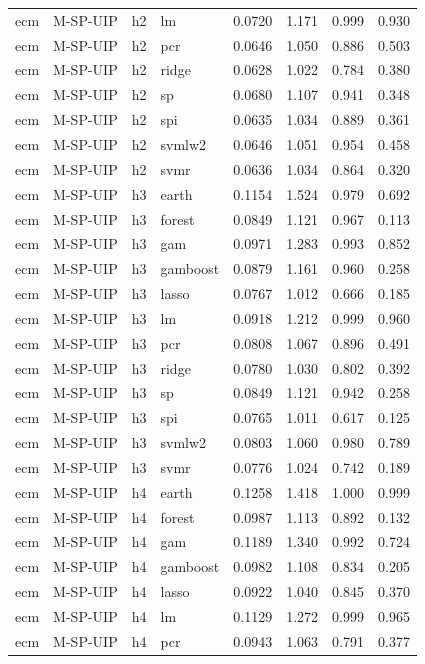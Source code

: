 \begin{ThreePartTable}
\begin{longtable}[t]{llclcccc}
ecm & M-SP-UIP & h2 & lm & 0.0720 & 1.171 & 0.999 & 0.930\\
ecm & M-SP-UIP & h2 & pcr & 0.0646 & 1.050 & 0.886 & 0.503\\
ecm & M-SP-UIP & h2 & ridge & 0.0628 & 1.022 & 0.784 & 0.380\\
ecm & M-SP-UIP & h2 & sp & 0.0680 & 1.107 & 0.941 & 0.348\\
ecm & M-SP-UIP & h2 & spi & 0.0635 & 1.034 & 0.889 & 0.361\\
ecm & M-SP-UIP & h2 & svmlw2 & 0.0646 & 1.051 & 0.954 & 0.458\\
ecm & M-SP-UIP & h2 & svmr & 0.0636 & 1.034 & 0.864 & 0.320\\
\addlinespace
ecm & M-SP-UIP & h3 & earth & 0.1154 & 1.524 & 0.979 & 0.692\\
ecm & M-SP-UIP & h3 & forest & 0.0849 & 1.121 & 0.967 & 0.113\\
ecm & M-SP-UIP & h3 & gam & 0.0971 & 1.283 & 0.993 & 0.852\\
ecm & M-SP-UIP & h3 & gamboost & 0.0879 & 1.161 & 0.960 & 0.258\\
ecm & M-SP-UIP & h3 & lasso & 0.0767 & 1.012 & 0.666 & 0.185\\
ecm & M-SP-UIP & h3 & lm & 0.0918 & 1.212 & 0.999 & 0.960\\
ecm & M-SP-UIP & h3 & pcr & 0.0808 & 1.067 & 0.896 & 0.491\\
ecm & M-SP-UIP & h3 & ridge & 0.0780 & 1.030 & 0.802 & 0.392\\
ecm & M-SP-UIP & h3 & sp & 0.0849 & 1.121 & 0.942 & 0.258\\
ecm & M-SP-UIP & h3 & spi & 0.0765 & 1.011 & 0.617 & 0.125\\
ecm & M-SP-UIP & h3 & svmlw2 & 0.0803 & 1.060 & 0.980 & 0.789\\
ecm & M-SP-UIP & h3 & svmr & 0.0776 & 1.024 & 0.742 & 0.189\\
\addlinespace
ecm & M-SP-UIP & h4 & earth & 0.1258 & 1.418 & 1.000 & 0.999\\
ecm & M-SP-UIP & h4 & forest & 0.0987 & 1.113 & 0.892 & 0.132\\
ecm & M-SP-UIP & h4 & gam & 0.1189 & 1.340 & 0.992 & 0.724\\
ecm & M-SP-UIP & h4 & gamboost & 0.0982 & 1.108 & 0.834 & 0.205\\
ecm & M-SP-UIP & h4 & lasso & 0.0922 & 1.040 & 0.845 & 0.370\\
ecm & M-SP-UIP & h4 & lm & 0.1129 & 1.272 & 0.999 & 0.965\\
ecm & M-SP-UIP & h4 & pcr & 0.0943 & 1.063 & 0.791 & 0.377\\

\end{longtable}
\end{ThreePartTable}
